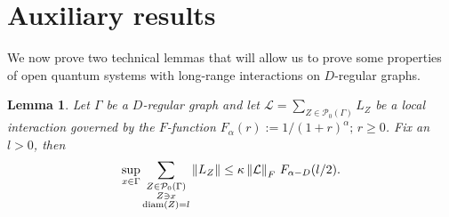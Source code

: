 \documentclass[11pt]{article}
\numberwithin{equation}{section}
\numberwithin{figure}{section}
\numberwithin{table}{section}
\theoremstyle{definition}
\theoremstyle{plain}
\newtheorem{lem}[thm]{Lemma}
\theoremstyle{remark}
\newcommand{\Li}{\mathcal{L}}
\newcommand{\G}{\Gamma}
\newcommand{\norm}[1]{\left\lVert#1\right\rVert}
\newcommand{\normm}[2]{\left\lVert#1\right\rVert_{#2}}
\begin{document}
    
\printbibliography


\appendix



\section{Auxiliary results}\label{app:auxiliary}

We now prove two technical lemmas that will allow us to prove some properties of open quantum systems with long-range interactions on $D$-regular graphs.

\medskip
\begin{lem}\label{lem:technicalLemmaFfunction}
    Let $\Gamma$ be a $D$-regular graph and let $\Li=\sum_{Z\in\mathcal{P}_0(\Gamma)}L_Z$ be a local interaction governed by the $F$-function $F_\alpha(r) :=1/(1+r)^\alpha;\,r\geq0$. Fix an $l>0$, then
    \begin{equation}
        \sup_{x\in\G}\sum\limits_{\substack{Z\in\mathcal{P}_0(\Gamma)\\ Z\ni x  \\ {\rm diam}(Z)= l}}\norm{L_Z}\leq \kappa \normm{\Li}{F}\,F_{\alpha-D}(l/2).
    \end{equation}
\end{lem}
\end{document}
